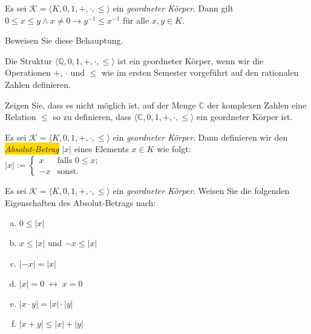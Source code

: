 \begin{Lemma} 
  Es sei  $\mathcal{K} = \langle K, 0, 1, +, \cdot, \leq \rangle$ ein \emph{geordneter K\"orper}.
  Dann gilt
  \\[0.2cm]
  \hspace*{1.3cm} $0 \leq x \leq y \wedge x \not= 0 \rightarrow y^{-1} \leq x^{-1}$
  \quad f\"ur alle $x, y \in K$.  
\end{Lemma}

\exercise
Beweisen Sie diese Behauptung.  \eox

\example
Die Struktur $\langle \mathbb{Q}, 0, 1, +, \cdot, \leq \rangle$ ist ein geordneter K\"orper, wenn wir
die Operationen $+$, $\cdot$ und $\leq$ wie im ersten Semester vorgef\"uhrt auf den rationalen Zahlen
definieren.  
\eox

\exercise
Zeigen Sie, dass es nicht m\"oglich ist, auf der Menge $\mathbb{C}$ der komplexen Zahlen eine Relation
$\leq$ so zu definieren, dass $\langle \mathbb{C}, 0, 1, +, \cdot, \leq \rangle$ ein geordneter
K\"orper ist. \eox

\begin{Definition}
  Es sei  $\mathcal{K} = \langle K, 0, 1, +, \cdot, \leq \rangle$ ein \emph{geordneter K\"orper}.
  Dann definieren wir den \colorbox{gold}{\emph{Absolut-Betrag}} $|x|$ eines Elements $x \in K$ wie folgt:
  \\[0.2cm]
  \hspace*{1.3cm}
  $|x| := \left\{
  \begin{array}{rl}
     x & \mbox{falls $0 \leq x$};  \\[0.1cm]
    -x & \mbox{sonst.}
  \end{array}
  \right.
  $\eox
\end{Definition}

\exercise
Es sei  $\mathcal{K} = \langle K, 0, 1, +, \cdot, \leq \rangle$ ein \emph{geordneter K\"orper}.
Weisen Sie die folgenden Eigenschaften des Absolut-Betrags nach:
\begin{enumerate}[(a)]
\item $0 \leq |x|$
\item $x \leq |x|$ \quad und \quad $-x \leq |x|$
\item $|-x| = |x|$
\item $|x| = 0 \;\leftrightarrow\; x = 0$
\item $|x \cdot y| = |x| \cdot |y|$
\item $|x+y| \leq |x| + |y|$ \eox
\end{enumerate}


